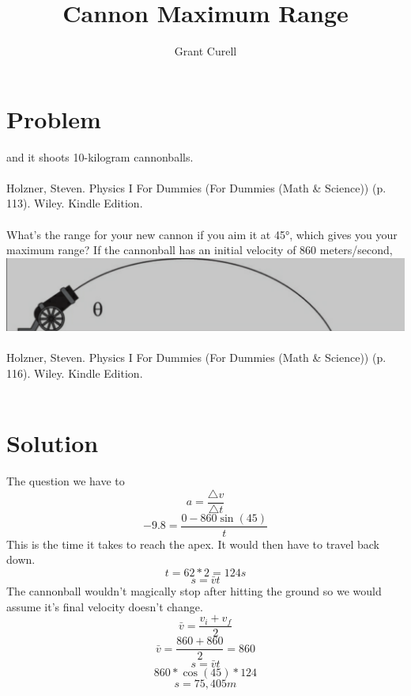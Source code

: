 \documentclass{article}
\title{Cannon Maximum Range}
\author{Grant Curell}
\begin{document}
\maketitle{}
\section{Problem}
and it shoots 10-kilogram cannonballs.
\\\\
Holzner, Steven. Physics I For Dummies (For Dummies (Math \& Science)) (p. 113). Wiley. Kindle Edition.
\\\\
What’s the range for your new cannon if you aim it at \ang{45}, which gives you your maximum range? If the cannonball has an initial velocity of 860 meters/second,
\includegraphics[width=\columnwidth]{image}
\\\\
Holzner, Steven. Physics I For Dummies (For Dummies (Math \& Science)) (p. 116). Wiley. Kindle Edition.
\\\\
\section{Solution}
The question we have to
\[ a=\frac{\triangle{v}}{\triangle{t}} \]
\[ -9.8=\frac{0-860\sin(45)}{t} \]
This is the time it takes to reach the apex. It would then have to travel back down.
\[ t = 62*2 = 124s \]
\[ s=\bar{v}t \]
The cannonball wouldn't magically stop after hitting the ground so we would assume it's final velocity doesn't change.
\[ \bar{v} = \frac{v_i+v_f}{2} \]
\[ \bar{v} = \frac{860 + 860}{2} = 860 \]
\[ s=\bar{v}t \]
\[ 860*\cos(45)*124 \]
\[ s=75,405m \]
\end{document}
